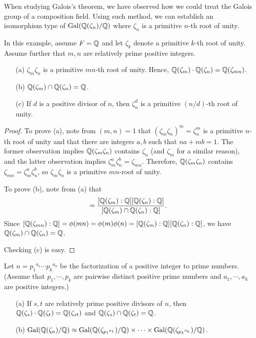 When studying Galois's theorem, we have observed how we could treat the Galois group of a composition field.
Using such method, we can establish an isomorphism type of ${\textrm{Gal}({{\mathbb{Q}}(\zeta_n)/{\mathbb{Q}}})}$ where $\zeta_n$ is a primitive $n$-th root of unity.
\begin{obs}
    In this example, assume $F={\mathbb{Q}}$ and let $\zeta_k$ denote a primitive $k$-th root of unity.
    Assume further that $m, n$ are relatively prime positive integers.
    \begin{enumerate}
        \item[(a)]
        {
            $\zeta_m\zeta_n$ is a primitive $mn$-th root of unity.
            Hence, ${\mathbb{Q}}(\zeta_m)\cdot{\mathbb{Q}}(\zeta_n)={\mathbb{Q}}(\zeta_{mn})$.
        }
        \item[(b)]
        {
            ${\mathbb{Q}}(\zeta_m)\cap{\mathbb{Q}}(\zeta_n)={\mathbb{Q}}$.
        }
        \item[(c)]
        {
            If $d$ is a positive divisor of $n$, then $\zeta_n^d$ is a primitive $(n/d)$-th root of unity.
        }
    \end{enumerate}
\end{obs}
\begin{proof}
    To prove (a), note from $(m, n)=1$ that $(\zeta_m\zeta_n)^m=\zeta_n^m$ is a primitive $n$-th root of unity and that there are integers $a, b$ such that $na+mb=1$.
    The former observation implies ${\mathbb{Q}}(\zeta_m\zeta_n)$ contains $\zeta_n$ (and $\zeta_m$ for a similar reason), and the latter observation implies $\zeta_m^a\zeta_n^b=\zeta_{mn}$.
    Therefore, ${\mathbb{Q}}(\zeta_m\zeta_n)$ contains $\zeta_{mn}=\zeta_m^a\zeta_n^b$, so $\zeta_m\zeta_n$ is a primitive $mn$-root of unity.

    To prove (b), note from (a) that
    \begin{align*}
        [\bb{Q}(\zeta_{mn}):\bb{Q}]=\frac{[\bb{Q}(\zeta_m):\bb{Q}][\bb{Q}(\zeta_n):\bb{Q}]}{[\bb{Q}(\zeta_m)\cap\bb{Q}(\zeta_n): \bb{Q}]}.
    \end{align*}
    Since $[{\mathbb{Q}}(\zeta_{mn}):{\mathbb{Q}}]=\phi(mn)=\phi(m)\phi(n)=[{\mathbb{Q}}(\zeta_m):{\mathbb{Q}}][{\mathbb{Q}}(\zeta_n):{\mathbb{Q}}]$, we have ${\mathbb{Q}}(\zeta_m)\cap{\mathbb{Q}}(\zeta_n)={\mathbb{Q}}$.

    Checking (c) is easy.
\end{proof}
\begin{prop}
    Let $n={p_1}^{a_1}\cdots{p_k}^{a_k}$ be the factorization of a positive integer to prime numbers. (Assume that $p_1, \cdots, p_k$ are pairwise distinct positive prime numbers and $a_1, \cdots, a_k$ are positive integers.)
    \begin{enumerate}
        \item[(a)]
        {
            If $s, t$ are relatively prime positive divisors of $n$, then ${\mathbb{Q}}(\zeta_s)\cdot{\mathbb{Q}}(\zeta_t)={\mathbb{Q}}(\zeta_{st})$ and ${\mathbb{Q}}(\zeta_s)\cap{\mathbb{Q}}(\zeta_t)={\mathbb{Q}}$.
        }
        \item[(b)]
        {
            ${\textrm{Gal}({{\mathbb{Q}}(\zeta_n)/{\mathbb{Q}}})}\approx{\textrm{Gal}({{\mathbb{Q}}(\zeta_{{p_1}^{a_1}})/{\mathbb{Q}}})}\times\cdots\times{\textrm{Gal}({{\mathbb{Q}}(\zeta_{{p_k}^{a_k}})/{\mathbb{Q}}})}$.
        }
    \end{enumerate}
\end{prop}
